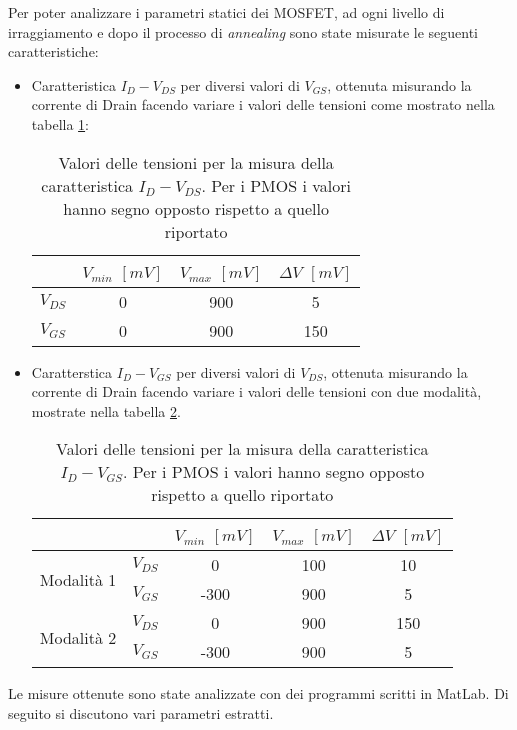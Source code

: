 Per poter analizzare i parametri statici dei MOSFET, ad ogni livello di irraggiamento e dopo il processo di \emph{annealing} sono state misurate le seguenti caratteristiche:

\begin{itemize}

\item{Caratteristica $I_D-V_{DS}$} per diversi valori di $V_{GS}$, ottenuta misurando la corrente di Drain facendo variare i valori delle tensioni come mostrato nella tabella \ref{tab:tensioniIdVds}:

\begin{table}[ht]
  \renewcommand{\arraystretch}{1.3}
  \centering
    \begin{tabular}{c c c c}
      \toprule
         & $V_{min}$ $[mV]$ & $V_{max}$ $[mV]$ & $\Delta V$ $[mV]$ \\
     \midrule
	  $V_{DS}$ & 0 & 900 & 5 \\
	\hline
	   $V_{GS}$ & 0 & 900 & 150\\
      \bottomrule
    \end{tabular}
  \caption[Valori delle tensioni per la misura della caratteristica $I_D-V_{DS}$]{Valori delle tensioni per la misura della caratteristica $I_D-V_{DS}$. Per i PMOS i valori hanno segno opposto rispetto a quello riportato}
  \label{tab:tensioniIdVds}
\end{table}

\item{Caratterstica $I_D-V_{GS}$} per diversi valori di $V_{DS}$, ottenuta misurando la corrente di Drain facendo variare i valori delle tensioni con due modalità, mostrate nella tabella \ref{tab:tensioniIdVgs}. 

\begin{table}[ht]
  \renewcommand{\arraystretch}{1.3}
  \centering
    \begin{tabular}{c c c c c}
      \toprule
        & & $V_{min}$ $[mV]$ & $V_{max}$ $[mV]$ & $\Delta V$ $[mV]$ \\
     \midrule
	  \multirow{2}{*}{Modalità 1} & $V_{DS}$ & 0 & 100 & 10 \\
	\cmidrule{2-5}
	  & $V_{GS}$ & -300 & 900 & 5\\
	\midrule
	  \multirow{2}{*}{Modalità 2} & $V_{DS}$ & 0 & 900 & 150 \\
	\cmidrule{2-5}
	  & $V_{GS}$ & -300 & 900 & 5\\
      \bottomrule
    \end{tabular}
  \caption[Valori delle tensioni per la misura della caratteristica $I_D-V_{GS}$]{Valori delle tensioni per la misura della caratteristica $I_D-V_{GS}$. Per i PMOS i valori hanno segno opposto rispetto a quello riportato}
  \label{tab:tensioniIdVgs}
\end{table}

\end{itemize}


Le misure ottenute sono state analizzate con dei programmi scritti in MatLab. Di seguito si discutono vari parametri estratti.
